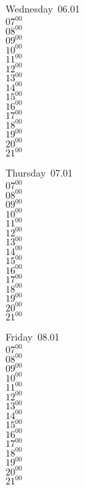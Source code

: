 \documentclass[11pt,a4paper]{book}\usepackage[]{graphicx}\usepackage[]{color}
\begin{document}
\begin{weekdaybox}
  Wednesday~06.01\\
  { 
  \vfill
  $07^{00}$\\
$08^{00}$\\
$09^{00}$\\
$10^{00}$\\
$11^{00}$\\
$12^{00}$\\
$13^{00}$\\
$14^{00}$\\
$15^{00}$\\
$16^{00}$\\
$17^{00}$\\
$18^{00}$\\
$19^{00}$\\
$20^{00}$\\
$21^{00}$\\
  }
\end{weekdaybox}
\clearpage
\begin{headerbox}
\end{headerbox}
\begin{weekdaybox}
  Thursday~07.01\\
  { 
  \vfill
  $07^{00}$\\
$08^{00}$\\
$09^{00}$\\
$10^{00}$\\
$11^{00}$\\
$12^{00}$\\
$13^{00}$\\
$14^{00}$\\
$15^{00}$\\
$16^{00}$\\
$17^{00}$\\
$18^{00}$\\
$19^{00}$\\
$20^{00}$\\
$21^{00}$\\
  }
\end{weekdaybox} 
\begin{weekdaybox}
  Friday~08.01\\
  { 
  \vfill
  $07^{00}$\\
$08^{00}$\\
$09^{00}$\\
$10^{00}$\\
$11^{00}$\\
$12^{00}$\\
$13^{00}$\\
$14^{00}$\\
$15^{00}$\\
$16^{00}$\\
$17^{00}$\\
$18^{00}$\\
$19^{00}$\\
$20^{00}$\\
$21^{00}$\\
  }
\end{weekdaybox}
\end{document}
